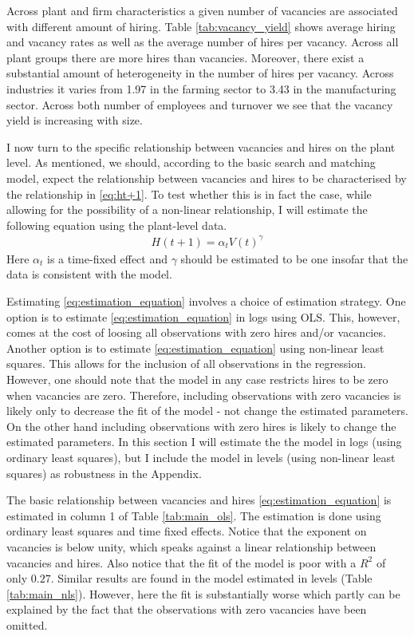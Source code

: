 Across plant and firm characteristics a given number of vacancies are associated with different amount of hiring. Table \ref{tab:vacancy_yield} shows average hiring and vacancy rates as well as the average number of hires per vacancy. Across all plant groups there are more hires than vacancies. Moreover, there exist a substantial amount of heterogeneity in the number of hires per vacancy. Across industries it varies from 1.97 in the farming sector to 3.43 in the manufacturing sector. Across both number of employees and turnover we see that the vacancy yield is increasing with size. 



I now turn to the specific relationship between vacancies and hires on the plant level. As mentioned, we should, according to the basic search and matching model, expect the relationship between vacancies and hires to be characterised by the relationship in \eqref{eq:ht+1}. To test whether this is in fact the case, while allowing for the possibility of a non-linear relationship, I will estimate the following equation using the plant-level data.
\begin{align}
H(t+1)=\alpha_t V(t)^{\gamma}
\label{eq:estimation_equation}
\end{align}
Here $\alpha_t$ is a time-fixed effect and $\gamma$ should be estimated to be one insofar that the data is consistent with the model.

Estimating \eqref{eq:estimation_equation} involves a choice of estimation strategy. One option is to estimate \eqref{eq:estimation_equation} in logs using OLS. This, however, comes at the cost of loosing all observations with zero hires and/or vacancies. Another option is to estimate \eqref{eq:estimation_equation} using non-linear least squares. This allows for the inclusion of all observations in the regression. However, one should note that the model in any case restricts hires to be zero when vacancies are zero. Therefore, including observations with zero vacancies is likely only to decrease the fit of the model - not change the estimated parameters. On the other hand including observations with zero hires is likely to change the estimated parameters. In this section I will estimate the the model in logs (using ordinary least squares), but I include the model in levels (using non-linear least squares) as robustness in the Appendix.

The basic relationship between vacancies and hires \eqref{eq:estimation_equation} is estimated in column 1 of Table \ref{tab:main_ols}. The estimation is done using ordinary least squares and time fixed effects. Notice that the exponent on vacancies is below unity, which speaks against a linear relationship between vacancies and hires. Also notice that the fit of the model is poor with a $R^2$ of only $0.27$. Similar results are found in the model estimated in levels (Table \ref{tab:main_nls}). However, here the fit is substantially worse which partly can be explained by the fact that the observations with zero vacancies have been omitted. 


